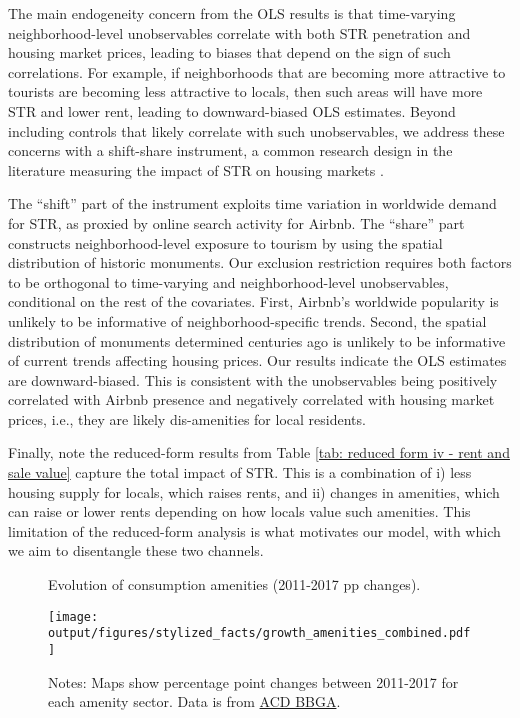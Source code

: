 \documentclass[11pt]{article}
\makeatletter
\let\conditionalinput\@input
\makeatother
\begin{document}
\conditionalinput{output/tables/reducedform_iv_rent_and_salevalue.tex}

The main endogeneity concern from the OLS results is that time-varying neighborhood-level unobservables correlate with both STR penetration and housing market prices, leading to biases that depend on the sign of such correlations. For example, if neighborhoods that are becoming more attractive to tourists are becoming less attractive to locals, then such areas will have more STR and lower rent, leading to downward-biased OLS estimates. Beyond including controls that likely correlate with such unobservables, we address these concerns with a shift-share instrument, a common research design in the literature measuring the impact of STR on housing markets \citep{barron2021effect, garcia2019short}. 

The ``shift'' part of the instrument exploits time variation in worldwide demand for STR, as proxied by online search activity for Airbnb. The ``share'' part constructs neighborhood-level exposure to tourism by using the spatial distribution of historic monuments. Our exclusion restriction requires both factors to be orthogonal to time-varying and neighborhood-level unobservables, conditional on the rest of the covariates. First, Airbnb's worldwide popularity is unlikely to be informative of neighborhood-specific trends. Second, the spatial distribution of monuments determined centuries ago is unlikely to be informative of current trends affecting housing prices. Our results indicate the OLS estimates are downward-biased. This is consistent with the unobservables being positively correlated with Airbnb presence and negatively correlated with housing market prices, i.e., they are likely dis-amenities for local residents. 

Finally, note the reduced-form results from Table \ref{tab: reduced form iv - rent and sale value} capture the total impact of STR. This is a combination of i) less housing supply for locals, which raises rents, and ii) changes in amenities, which can raise or lower rents depending on how locals value such amenities. This limitation of the reduced-form analysis is what motivates our model, with which we aim to disentangle these two channels.

\begin{figure}[H]
\centering
\caption{Evolution of consumption amenities (2011-2017 pp changes).}\label{fig:spatial evolution retail}
\centering
\texttt{[image: output/figures/stylized\_facts/growth\_amenities\_combined.pdf]}
\caption*{\footnotesize Notes: Maps show percentage point changes between 2011-2017 for each amenity sector. Data is from \href{https://data.amsterdam.nl/datasets/rl6-35tFAw2Ljw/basisbestand-gebieden-amsterdam-bbga/}{ACD BBGA}.}
\end{figure}
\end{document}
